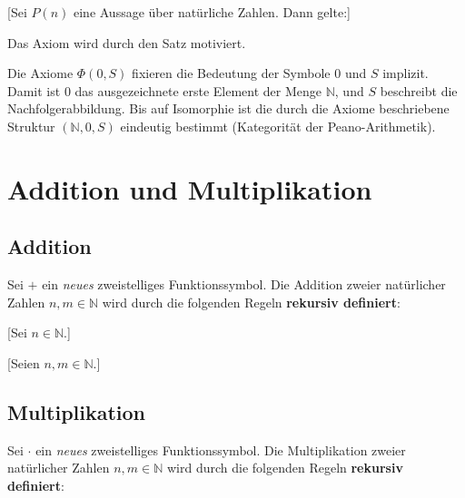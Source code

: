 \documentclass[main.tex]{subfiles}
\begin{document}
[Sei \(P(n)\) eine Aussage über natürliche Zahlen. Dann gelte:]
\begin{remark}
Das Axiom wird durch den Satz 
motiviert.
\end{remark}

\begin{remark}
Die Axiome \(\Phi(0,S)\) fixieren die Bedeutung der Symbole \(0\) und \(S\) 
implizit. 
Damit ist \(0\) das ausgezeichnete erste Element der Menge \(\mathbb{N}\), 
und \(S\) beschreibt die Nachfolgerabbildung. 
Bis auf Isomorphie ist die durch die Axiome beschriebene Struktur 
\((\mathbb{N},0,S)\) eindeutig bestimmt (Kategorität der Peano-Arithmetik).
\end{remark}



\chapter{Addition und Multiplikation}

\section{Addition}

\begin{definition}
Sei \(+\) ein \emph{neues} zweistelliges Funktionssymbol. 
Die Addition zweier natürlicher Zahlen \(n,m \in \mathbb{N}\) 
wird durch die folgenden Regeln \textbf{rekursiv definiert}:
\end{definition}

[Sei \(n \in \mathbb{N}\).]

[Seien \(n,m \in \mathbb{N}\).]


\section{Multiplikation}

\begin{definition}
Sei \(\cdot\) ein \emph{neues} zweistelliges Funktionssymbol. 
Die Multiplikation zweier natürlicher Zahlen \(n,m \in \mathbb{N}\) 
wird durch die folgenden Regeln \textbf{rekursiv definiert}:
\end{definition}
\end{document}
